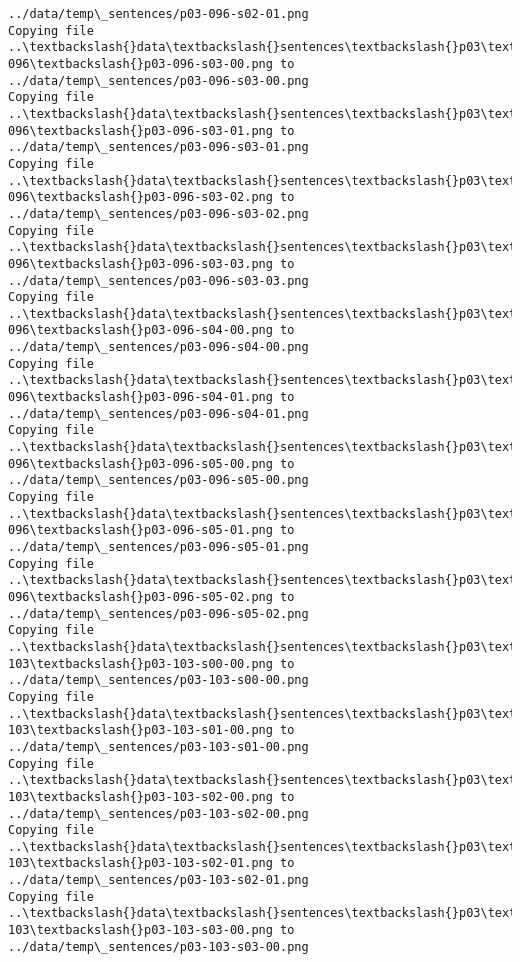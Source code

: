 \documentclass[11pt]{article}
\begin{document}
\begin{Verbatim}[commandchars=\\\{\}]
../data/temp\_sentences/p03-096-s02-01.png
Copying file ..\textbackslash{}data\textbackslash{}sentences\textbackslash{}p03\textbackslash{}p03-096\textbackslash{}p03-096-s03-00.png to
../data/temp\_sentences/p03-096-s03-00.png
Copying file ..\textbackslash{}data\textbackslash{}sentences\textbackslash{}p03\textbackslash{}p03-096\textbackslash{}p03-096-s03-01.png to
../data/temp\_sentences/p03-096-s03-01.png
Copying file ..\textbackslash{}data\textbackslash{}sentences\textbackslash{}p03\textbackslash{}p03-096\textbackslash{}p03-096-s03-02.png to
../data/temp\_sentences/p03-096-s03-02.png
Copying file ..\textbackslash{}data\textbackslash{}sentences\textbackslash{}p03\textbackslash{}p03-096\textbackslash{}p03-096-s03-03.png to
../data/temp\_sentences/p03-096-s03-03.png
Copying file ..\textbackslash{}data\textbackslash{}sentences\textbackslash{}p03\textbackslash{}p03-096\textbackslash{}p03-096-s04-00.png to
../data/temp\_sentences/p03-096-s04-00.png
Copying file ..\textbackslash{}data\textbackslash{}sentences\textbackslash{}p03\textbackslash{}p03-096\textbackslash{}p03-096-s04-01.png to
../data/temp\_sentences/p03-096-s04-01.png
Copying file ..\textbackslash{}data\textbackslash{}sentences\textbackslash{}p03\textbackslash{}p03-096\textbackslash{}p03-096-s05-00.png to
../data/temp\_sentences/p03-096-s05-00.png
Copying file ..\textbackslash{}data\textbackslash{}sentences\textbackslash{}p03\textbackslash{}p03-096\textbackslash{}p03-096-s05-01.png to
../data/temp\_sentences/p03-096-s05-01.png
Copying file ..\textbackslash{}data\textbackslash{}sentences\textbackslash{}p03\textbackslash{}p03-096\textbackslash{}p03-096-s05-02.png to
../data/temp\_sentences/p03-096-s05-02.png
Copying file ..\textbackslash{}data\textbackslash{}sentences\textbackslash{}p03\textbackslash{}p03-103\textbackslash{}p03-103-s00-00.png to
../data/temp\_sentences/p03-103-s00-00.png
Copying file ..\textbackslash{}data\textbackslash{}sentences\textbackslash{}p03\textbackslash{}p03-103\textbackslash{}p03-103-s01-00.png to
../data/temp\_sentences/p03-103-s01-00.png
Copying file ..\textbackslash{}data\textbackslash{}sentences\textbackslash{}p03\textbackslash{}p03-103\textbackslash{}p03-103-s02-00.png to
../data/temp\_sentences/p03-103-s02-00.png
Copying file ..\textbackslash{}data\textbackslash{}sentences\textbackslash{}p03\textbackslash{}p03-103\textbackslash{}p03-103-s02-01.png to
../data/temp\_sentences/p03-103-s02-01.png
Copying file ..\textbackslash{}data\textbackslash{}sentences\textbackslash{}p03\textbackslash{}p03-103\textbackslash{}p03-103-s03-00.png to
../data/temp\_sentences/p03-103-s03-00.png

\end{Verbatim}
\end{document}
